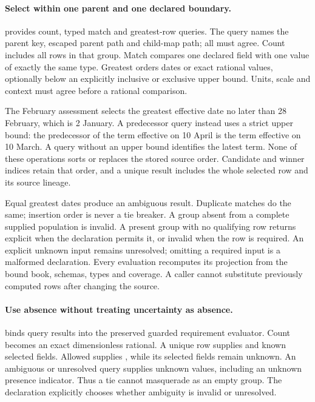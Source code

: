 \paragraph{Select within one parent and one declared boundary.}
 provides count, typed match and greatest-row queries.
The query names the parent key, escaped parent path and child-map path; all
must agree. Count includes all rows in that group. Match compares one declared
field with one value of exactly the same type. Greatest orders dates or exact
rational values, optionally below an explicitly inclusive or exclusive upper
bound. Units, scale and context must agree before a rational comparison.

The February assessment selects the greatest effective date no later than
28 February, which is 2 January. A predecessor query instead uses a strict
upper bound: the predecessor of the term effective on 10 April is the term
effective on 10 March. A query without an upper bound identifies the latest
term. None of these operations sorts or replaces the stored source order.
Candidate and winner indices retain that order, and a unique result includes
the whole selected row and its source lineage.

Equal greatest dates produce an ambiguous result. Duplicate matches do the
same; insertion order is never a tie breaker. A group absent from a complete
supplied population is invalid. A present group with no qualifying row returns
explicit  when the declaration permits it, or invalid when the row
is required. An explicit unknown input remains unresolved; omitting a required
input is a malformed declaration. Every evaluation recomputes its projection
from the bound book, schemas, types and coverage. A caller cannot substitute
previously computed rows after changing the source.

\paragraph{Use absence without treating uncertainty as absence.}
 binds query results into the preserved guarded
requirement evaluator. Count becomes an exact dimensionless rational. A unique
row supplies  and known selected fields. Allowed
 supplies , while its selected fields remain
unknown. An ambiguous or unresolved query supplies unknown values, including
an unknown presence indicator. Thus a tie cannot masquerade as an empty group.
The declaration explicitly chooses whether ambiguity is invalid or unresolved.

